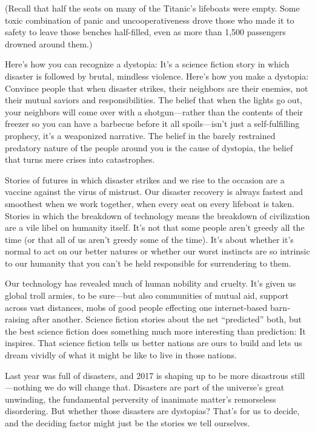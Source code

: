 \documentclass{article}
\begin{document}
(Recall that half the seats on many of the Titanic’s lifeboats were empty. Some toxic combination of panic and unco­operativeness drove those who made it to safety to leave those benches half-filled, even as more than 1,500 passen­gers drowned around them.)

Here’s how you can recognize a dystopia: It’s a science fiction story in which disaster is followed by brutal, mindless violence. Here’s how you make a dystopia: Convince people that when disaster strikes, their neighbors are their enemies, not their mutual saviors and responsibilities. The belief that when the lights go out, your neighbors will come over with a shotgun—rather than the contents of their freezer so you can have a barbecue before it all spoils—isn’t just a self-fulfilling prophecy, it’s a weaponized narrative. The belief in the barely restrained predatory nature of the people around you is the cause of dystopia, the belief that turns mere crises into catastrophes.

Stories of futures in which disaster strikes and we rise to the occasion are a vaccine against the virus of mistrust. Our disaster recovery is always fastest and smoothest when we work together, when every seat on every lifeboat is taken. Stories in which the breakdown of technology means the breakdown of civilization are a vile libel on humanity itself. It’s not that some people aren’t greedy all the time (or that all of us aren’t greedy some of the time). It’s about whether it’s normal to act on our better natures or whether our worst instincts are so intrinsic to our humanity that you can’t be held responsible for surrendering to them.

Our technology has revealed much of human nobility and cruelty. It’s given us global troll armies, to be sure—but also communities of mutual aid, support across vast distances, mobs of good people effecting one internet-­based barn­raising after another. Science fiction stories about the net “predicted” both, but the best science fiction does some­thing much more interesting than prediction: It inspires. That science fiction tells us better nations are ours to build and lets us dream vividly of what it might be like to live in those nations.

Last year was full of disasters, and 2017 is shaping up to be more disastrous still—nothing we do will change that. Disasters are part of the universe’s great unwinding, the fundamental perversity of inanimate matter’s remorseless disordering. But whether those disasters are dystopias? That’s for us to decide, and the deciding factor might just be the stories we tell ourselves.
\end{document}
